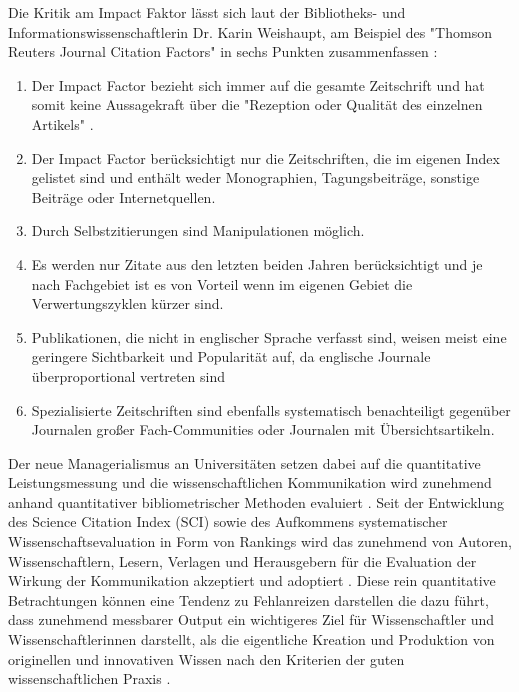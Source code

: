 Die Kritik am Impact Faktor lässt sich laut der Bibliotheks- und Informationswissenschaftlerin Dr. Karin Weishaupt, am Beispiel des "Thomson Reuters Journal Citation Factors" in sechs Punkten zusammenfassen \cite{weishaupt_2009_goldenOA}:
\begin{enumerate}
\item Der Impact Factor bezieht sich immer auf die gesamte Zeitschrift und hat somit keine Aussagekraft über die "Rezeption oder Qualität des einzelnen Artikels" \cite{weishaupt_2009_goldenOA}.
\item Der Impact Factor berücksichtigt nur die Zeitschriften, die im eigenen Index gelistet sind und enthält weder Monographien, Tagungsbeiträge, sonstige Beiträge oder Internetquellen.
\item Durch Selbstzitierungen sind Manipulationen möglich.
\item Es werden nur Zitate aus den letzten beiden Jahren berücksichtigt und je nach Fachgebiet ist es von Vorteil wenn im eigenen Gebiet die Verwertungszyklen kürzer sind.
\item Publikationen, die nicht in englischer Sprache verfasst sind, weisen meist eine geringere Sichtbarkeit und Popularität auf, da englische Journale überproportional vertreten sind
\item Spezialisierte Zeitschriften sind ebenfalls systematisch benachteiligt gegenüber Journalen großer Fach-Communities oder Journalen mit Übersichtsartikeln.
\end{enumerate}

Der neue Managerialismus an Universitäten setzen dabei auf die quantitative Leistungsmessung und die wissenschaftlichen Kommunikation wird zunehmend anhand quantitativer bibliometrischer Methoden evaluiert \cite[:40]{Frost_2014}. Seit der Entwicklung des Science Citation Index (SCI) sowie des Aufkommens systematischer Wissenschaftsevaluation in Form von Rankings wird das zunehmend von Autoren, Wissenschaftlern, Lesern, Verlagen und Herausgebern für die Evaluation der Wirkung der Kommunikation akzeptiert und adoptiert \cite[:2]{haustein_2012_multidimensional}. Diese rein quantitative Betrachtungen können eine Tendenz zu Fehlanreizen darstellen \cite{wr_2015_wissenschaft_integritaet} die dazu führt, dass zunehmend messbarer Output ein wichtigeres Ziel für Wissenschaftler und Wissenschaftlerinnen darstellt, als die eigentliche Kreation und Produktion von originellen und innovativen Wissen nach den Kriterien der guten wissenschaftlichen Praxis \cite[:41]{Frost_2014}.

